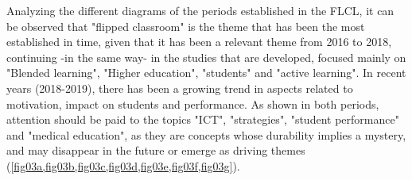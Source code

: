 \documentclass{textolivre}
\begin{document}
Analyzing the different diagrams of the periods established in the FLCL, it can be observed that "flipped classroom" is the theme that has been the most established in time, given that it has been a relevant theme from 2016 to 2018, continuing -in the same way- in the studies that are developed, focused mainly on "Blended learning", "Higher education", "students" and "active learning". In recent years (2018-2019), there has been a growing trend in aspects related to motivation, impact on students and performance. As shown in both periods, attention should be paid to the topics "ICT", "strategies", "student performance" and "medical education", as they are concepts whose durability implies a mystery, and may disappear in the future or emerge as driving themes (\cref{fig03a,fig03b,fig03c,fig03d,fig03e,fig03f,fig03g}).
\end{document}
